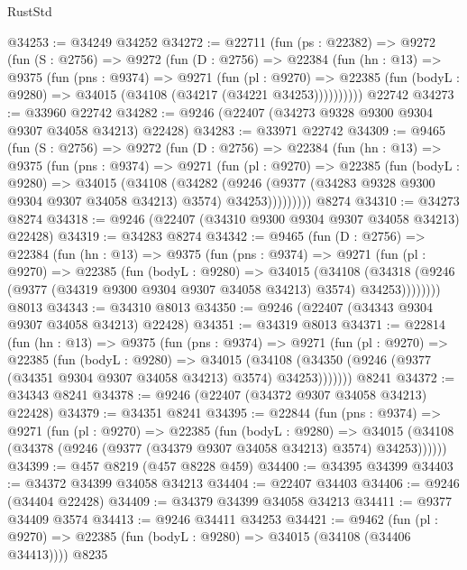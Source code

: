 \begin{lexlean}{RustStd}
\begin{coremodule}
@34253 := @34249 @34252
@34272 := @22711
    (fun (ps : @22382) =>
    @9272
      (fun (S : @2756) =>
      @9272
        (fun (D : @2756) =>
        @22384
          (fun (hn : @13) =>
          @9375
            (fun (pns : @9374) =>
            @9271
              (fun (pl : @9270) =>
              @22385 (fun (bodyL : @9280) => @34015 (@34108 (@34217 (@34221 @34253))))))))))
    @22742
@34273 := @33960 @22742
@34282 := @9246 (@22407 (@34273 @9328 @9300 @9304 @9307 @34058 @34213) @22428)
@34283 := @33971 @22742
@34309 := @9465
    (fun (S : @2756) =>
    @9272
      (fun (D : @2756) =>
      @22384
        (fun (hn : @13) =>
        @9375
          (fun (pns : @9374) =>
          @9271
            (fun (pl : @9270) =>
            @22385
              (fun (bodyL : @9280) =>
              @34015
                (@34108
                  (@34282
                    (@9246
                      (@9377 (@34283 @9328 @9300 @9304 @9307 @34058 @34213) @3574)
                      @34253)))))))))
    @8274
@34310 := @34273 @8274
@34318 := @9246 (@22407 (@34310 @9300 @9304 @9307 @34058 @34213) @22428)
@34319 := @34283 @8274
@34342 := @9465
    (fun (D : @2756) =>
    @22384
      (fun (hn : @13) =>
      @9375
        (fun (pns : @9374) =>
        @9271
          (fun (pl : @9270) =>
          @22385
            (fun (bodyL : @9280) =>
            @34015
              (@34108
                (@34318 (@9246 (@9377 (@34319 @9300 @9304 @9307 @34058 @34213) @3574) @34253))))))))
    @8013
@34343 := @34310 @8013
@34350 := @9246 (@22407 (@34343 @9304 @9307 @34058 @34213) @22428)
@34351 := @34319 @8013
@34371 := @22814
    (fun (hn : @13) =>
    @9375
      (fun (pns : @9374) =>
      @9271
        (fun (pl : @9270) =>
        @22385
          (fun (bodyL : @9280) =>
          @34015
            (@34108 (@34350 (@9246 (@9377 (@34351 @9304 @9307 @34058 @34213) @3574) @34253)))))))
    @8241
@34372 := @34343 @8241
@34378 := @9246 (@22407 (@34372 @9307 @34058 @34213) @22428)
@34379 := @34351 @8241
@34395 := @22844
    (fun (pns : @9374) =>
    @9271
      (fun (pl : @9270) =>
      @22385
        (fun (bodyL : @9280) =>
        @34015 (@34108 (@34378 (@9246 (@9377 (@34379 @9307 @34058 @34213) @3574) @34253))))))
@34399 := @457 @8219 (@457 @8228 @459)
@34400 := @34395 @34399
@34403 := @34372 @34399 @34058 @34213
@34404 := @22407 @34403
@34406 := @9246 (@34404 @22428)
@34409 := @34379 @34399 @34058 @34213
@34411 := @9377 @34409 @3574
@34413 := @9246 @34411 @34253
@34421 := @9462
    (fun (pl : @9270) => @22385 (fun (bodyL : @9280) => @34015 (@34108 (@34406 @34413))))
    @8235

\end{coremodule}
\end{lexlean}

